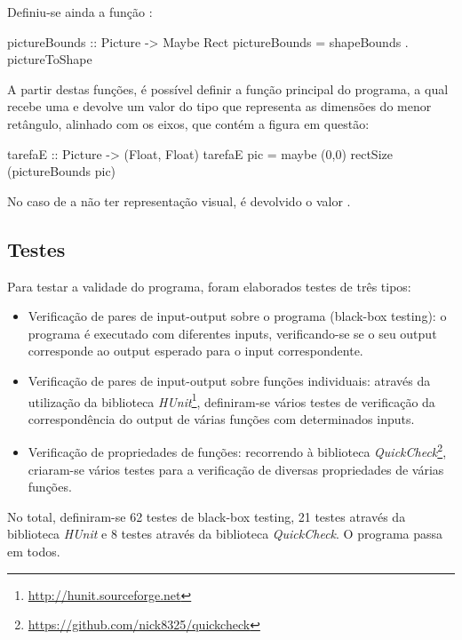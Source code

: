 \documentclass[a4paper]{article}
\begin{document}
\bigskip

Definiu-se ainda a função :

\begin{haskellblock}
pictureBounds :: Picture -> Maybe Rect
pictureBounds = shapeBounds . pictureToShape
\end{haskellblock}

A partir destas funções, é possível definir a função principal do programa, a qual recebe uma  e devolve um valor do tipo  que representa as dimensões do menor retângulo, alinhado com os eixos, que contém a figura em questão:

\begin{haskellblock}
tarefaE :: Picture -> (Float, Float)
tarefaE pic = maybe (0,0) rectSize (pictureBounds pic)
\end{haskellblock}

No caso de a  não ter representação visual, é devolvido o valor .

\subsection{Testes}

Para testar a validade do programa, foram elaborados testes de três tipos:

\begin{itemize}
	\item Verificação de pares de input-output sobre o programa (black-box testing): o programa é executado com diferentes inputs, verificando-se se o seu output corresponde ao output esperado para o input correspondente.
	\item Verificação de pares de input-output sobre funções individuais: através da utilização da biblioteca \textit{HUnit}\footnote{\url{http://hunit.sourceforge.net}}, definiram-se vários testes de verificação da correspondência do output de várias funções com determinados inputs.
	\item Verificação de propriedades de funções: recorrendo à biblioteca \textit{QuickCheck}\footnote{\url{https://github.com/nick8325/quickcheck}}, criaram-se vários testes para a verificação de diversas propriedades de várias funções.
\end{itemize}

No total, definiram-se 62 testes de black-box testing, 21 testes através da biblioteca \textit{HUnit} e 8 testes através da biblioteca \textit{QuickCheck}. O programa passa em todos.
\end{document}
